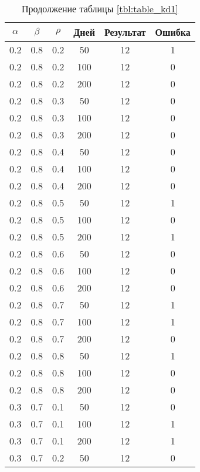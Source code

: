 \begin{table}[h]
	\begin{center}
        \captionsetup{justification=raggedright,singlelinecheck=off}
		\caption*{Продолжение таблицы \ref{tbl:table_kd1}}
		\begin{tabular}{|c|c|c|c|c|c|}
  	\hline
	$\alpha$ & $\beta$ & $\rho$ & Дней & Результат & Ошибка \\
   \hline
	0.2 &  0.8 &  0.2 &   50 &    12 &     1 \\
	0.2 &  0.8 &  0.2 &  100 &    12 &     0 \\
	0.2 &  0.8 &  0.2 &  200 &    12 &     0 \\
   \hline
	0.2 &  0.8 &  0.3 &   50 &    12 &     0 \\
	0.2 &  0.8 &  0.3 &  100 &    12 &     0 \\
	0.2 &  0.8 &  0.3 &  200 &    12 &     0 \\
   \hline
	0.2 &  0.8 &  0.4 &   50 &    12 &     0 \\
	0.2 &  0.8 &  0.4 &  100 &    12 &     0 \\
	0.2 &  0.8 &  0.4 &  200 &    12 &     0 \\
   \hline
	0.2 &  0.8 &  0.5 &   50 &    12 &     1 \\
	0.2 &  0.8 &  0.5 &  100 &    12 &     0 \\
	0.2 &  0.8 &  0.5 &  200 &    12 &     1 \\ 
    \hline
	0.2 &  0.8 &  0.6 &   50 &    12 &     0 \\
	0.2 &  0.8 &  0.6 &  100 &    12 &     0 \\
	0.2 &  0.8 &  0.6 &  200 &    12 &     0 \\
   \hline
	0.2 &  0.8 &  0.7 &   50 &    12 &     1 \\
	0.2 &  0.8 &  0.7 &  100 &    12 &     1 \\
	0.2 &  0.8 &  0.7 &  200 &    12 &     0 \\
   \hline
	0.2 &  0.8 &  0.8 &   50 &    12 &     1 \\
	0.2 &  0.8 &  0.8 &  100 &    12 &     0 \\
	0.2 &  0.8 &  0.8 &  200 &    12 &     0 \\
   \hline
	0.3 &  0.7 &  0.1 &   50 &    12 &     0 \\
	0.3 &  0.7 &  0.1 &  100 &    12 &     1 \\
	0.3 &  0.7 &  0.1 &  200 &    12 &     1 \\
   \hline
	0.3 &  0.7 &  0.2 &   50 &    12 &     0 \\

\end{tabular}
\end{center}
\end{table}
